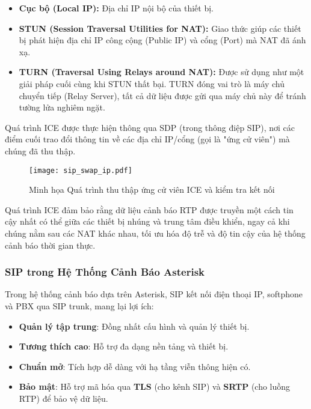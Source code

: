\begin{itemize}
    \item \textbf{Cục bộ (Local IP):} Địa chỉ IP nội bộ của thiết bị.
    \item \textbf{STUN (Session Traversal Utilities for NAT):} Giao thức giúp các thiết bị phát hiện địa chỉ IP công cộng (Public IP) và cổng (Port) mà NAT đã ánh xạ.
    \item \textbf{TURN (Traversal Using Relays around NAT):} Được sử dụng như một giải pháp cuối cùng khi STUN thất bại. TURN đóng vai trò là máy chủ chuyển tiếp (Relay Server), tất cả dữ liệu được gửi qua máy chủ này để tránh tường lửa nghiêm ngặt.
\end{itemize}

Quá trình ICE được thực hiện thông qua SDP (trong thông điệp SIP), nơi các điểm cuối trao đổi thông tin về các địa chỉ IP/cổng (gọi là "ứng cử viên") mà chúng đã thu thập.

\begin{figure}[h]
    \centering
    \texttt{[image: sip\_swap\_ip.pdf]}
    \caption{Minh họa Quá trình thu thập ứng cử viên ICE và kiểm tra kết nối}
    \label{fig:ice_flow_symmetric}
\end{figure}

Quá trình ICE đảm bảo rằng dữ liệu cảnh báo RTP được truyền một cách tin cậy nhất có thể giữa các thiết bị nhúng và trung tâm điều khiển, ngay cả khi chúng nằm sau các NAT khác nhau, tối ưu hóa độ trễ và độ tin cậy của hệ thống cảnh báo thời gian thực.

\subsubsection{SIP trong Hệ Thống Cảnh Báo Asterisk}
\label{subsubsec:sip_asterisk_integration}

Trong hệ thống cảnh báo dựa trên Asterisk, SIP kết nối điện thoại IP, softphone và PBX qua SIP trunk, mang lại lợi ích:

\begin{itemize}
\item \textbf{Quản lý tập trung}: Đồng nhất cấu hình và quản lý thiết bị.
\item \textbf{Tương thích cao}: Hỗ trợ đa dạng nền tảng và thiết bị.
\item \textbf{Chuẩn mở}: Tích hợp dễ dàng với hạ tầng viễn thông hiện có.
\item \textbf{Bảo mật}: Hỗ trợ mã hóa qua \textbf{TLS} (cho kênh SIP) và \textbf{SRTP} (cho luồng RTP) để bảo vệ dữ liệu.
\end{itemize}

